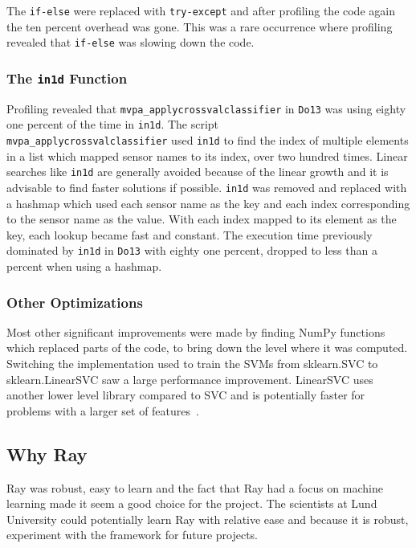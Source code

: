 \documentclass[12pt, a4paper]{article}
\begin{document}
The \texttt{if-else} were replaced with \texttt{try-except} and after profiling the code again the ten percent overhead was gone.
This was a rare occurrence where profiling revealed that \texttt{if-else} was slowing down the code.

\subsubsection{The \texttt{in1d} Function}

Profiling revealed that \texttt{mvpa\_applycrossvalclassifier} in \texttt{Do13} was using eighty one percent of the time in \texttt{in1d}.
The script \\\texttt{mvpa\_applycrossvalclassifier} used \texttt{in1d} to find the index of multiple elements in a list which mapped sensor names to its index, over two hundred times.
Linear searches like \texttt{in1d} are generally avoided because of the linear growth and it is advisable to find faster solutions if possible.
\texttt{in1d} was removed and replaced with a hashmap which used each sensor name as the key and each index corresponding to the sensor name as the value.
With each index mapped to its element as the key, each lookup became fast and constant.
The execution time previously dominated by \texttt{in1d} in \texttt{Do13} with eighty one percent, dropped to less than a percent when using a hashmap.

\subsubsection{Other Optimizations}

Most other significant improvements were made by finding NumPy functions which replaced parts of the code, to bring down the level where it was computed.
Switching the implementation used to train the SVMs from sklearn.SVC to sklearn.LinearSVC saw a large performance improvement.
LinearSVC uses another lower level library compared to SVC and is potentially faster for problems with a larger set of features~\cite{LinearSVC,SVMSVC}.

\subsection{Why Ray}

Ray was robust, easy to learn and the fact that Ray had a focus on machine learning made it seem a good choice for the project.
The scientists at Lund University could potentially learn Ray with relative ease and because it is robust, experiment with the framework for future projects.
\end{document}
